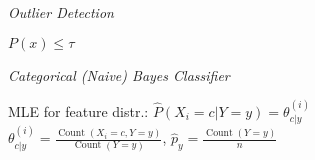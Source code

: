 \columnbreak

\emph{Outlier Detection}

$P(x) \leq \tau$

\emph{Categorical (Naive) Bayes Classifier}

MLE for feature distr.:
$\hat{P}(X_i \!=\! c\vert Y \!=\! y) = \theta_{c\vert y}^{(i)}$\\
$\theta_{c\vert y}^{(i)} = \frac{\operatorname{Count}(X_i = c, Y = y)}{\operatorname{Count}(Y=y)}$, \enskip $\hat p_y = \frac{\operatorname{Count}(Y=y)}{n}$
